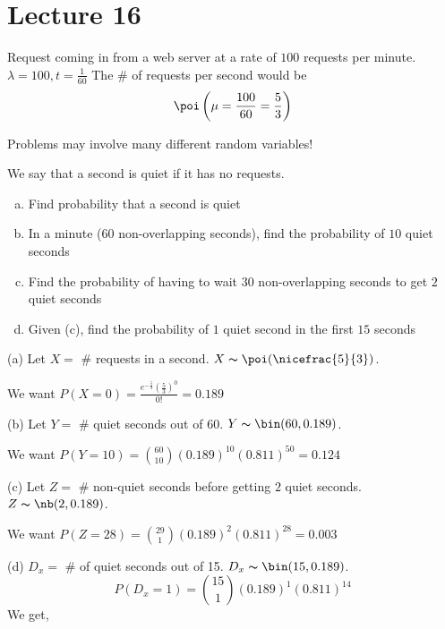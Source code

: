 \section{Lecture 16}

Request coming in from a web server at a rate of $ 100 $ requests per minute.
$ \lambda = 100, t=\frac{1}{60} $
The \# of requests per second would be
\[ \poi\left(\mu=\frac{100}{60}=\frac{5}{3}\right) \]


Problems may involve many different random variables!


We say that a second is quiet if it has no requests.
\begin{enumerate}[(a)]
    \item Find probability that a second is quiet
    \item In a minute ($60$ non-overlapping seconds), find the probability of $10$ quiet seconds
    \item Find the probability of having to wait $ 30 $ non-overlapping seconds to get $ 2 $ quiet seconds
    \item Given (c), find the probability of $ 1 $ quiet second in the first $ 15 $ seconds
\end{enumerate}
(a) Let $ X= $ \# requests in a second. $ X \thicksim \poi(\nicefrac{5}{3}) $.

We want $ P(X=0)=\frac{e^{-\frac{5}{3}}\left(\frac{5}{3}\right)^0}{0!}=0.189 $


(b) Let $ Y= $ \# quiet seconds out of 60. $ Y \thicksim \bin(60,0.189) $.

We want $ P(Y=10)=\binom{60}{10}(0.189)^{10}(0.811)^{50}=0.124 $

(c) Let $ Z= $ \# non-quiet seconds before getting $ 2 $ quiet seconds. 
$ Z \thicksim \nb(2,0.189) $.

We want $ P(Z=28)=\binom{29}{1}(0.189)^2(0.811)^{28}=0.003 $

(d) $ D_x=$ \# of quiet seconds out of 15. $ D_x \thicksim \bin(15,0.189) $.
\[ P(D_x=1)=\binom{15}{1}(0.189)^1(0.811)^{14} \]
We get,

